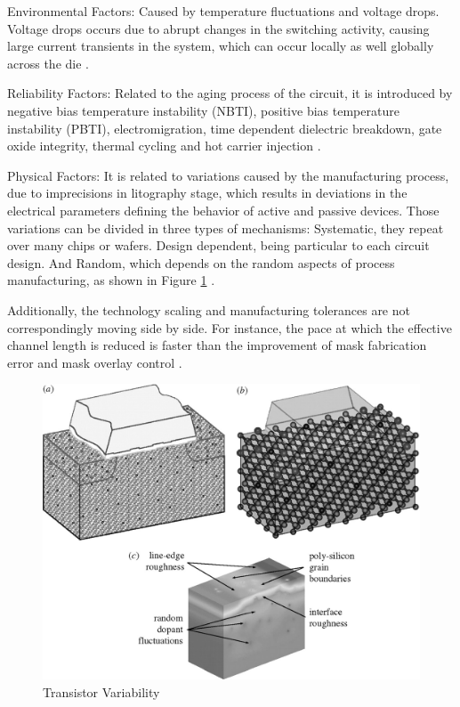\documentclass[ecp,tc, english]{iiufrgs}
\begin{document}
Environmental Factors:  
Caused by temperature fluctuations and voltage drops. Voltage drops occurs due to abrupt changes in the switching activity, causing large current transients in the system, which can occur locally as well globally across the die \cite{nassif:08}. 
 
Reliability Factors: 
Related to the aging process of the circuit, it is introduced by negative bias temperature instability (NBTI), positive bias temperature instability (PBTI), electromigration, time dependent dielectric breakdown, gate oxide integrity, thermal cycling and hot carrier injection \cite{nassif:08}.
 
Physical Factors:
It is related to variations caused by the manufacturing process, due to imprecisions in litography stage, which results in deviations in the electrical parameters defining the behavior of active and passive devices. Those variations can be divided in three types of mechanisms: Systematic, they repeat over many chips or wafers. Design dependent, being particular to each circuit design. And Random, which depends on the random aspects of process manufacturing, as shown in Figure \ref{fig:Fig2} \cite{nassif:08}.

Additionally, the technology scaling and manufacturing tolerances are not correspondingly moving side by side. For instance, the pace at which the effective channel length is reduced is faster than the improvement of mask fabrication error and mask overlay control \cite{nassif:08} \cite{aghababa2009static}.

\begin{figure}[H]
\centering
\includegraphics[width=\textwidth]{transistorVariability.jpg}
\caption{Transistor Variability}
\label{fig:Fig2}
\end{figure}
\end{document}

